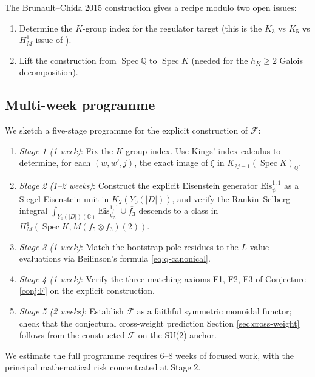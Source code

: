 \documentclass[11pt]{amsart}
\theoremstyle{definition}
\theoremstyle{remark}
\DeclareMathOperator{\Spec}{Spec}
\newcommand{\Q}{\mathbb{Q}}
\newcommand{\C}{\mathbb{C}}
\begin{document}
The Brunault--Chida 2015 construction \cite{BrunaultChida2015} gives a
recipe modulo two open issues:
\begin{enumerate}
\item Determine the $K$-group index for the regulator target (this
is the $K_3$ vs $K_5$ vs $H^1_M$ issue of \cite{OPBeilinsonQD}).
\item Lift the construction from $\Spec \Q$ to $\Spec K$
(needed for the $h_K \ge 2$ Galois decomposition).
\end{enumerate}

\subsection{Multi-week programme}\label{ss:multi-week}

We sketch a five-stage programme for the explicit construction of
$\mathcal{F}$:

\begin{enumerate}
\item \emph{Stage 1 (1 week)}: Fix the $K$-group index. Use Kings'
\cite{KingsSprang2025} index calculus to determine, for each
$(w, w', j)$, the exact image of $\xi$ in $K_{2j-1}(\Spec K)_\Q$.

\item \emph{Stage 2 (1--2 weeks)}: Construct the explicit Eisenstein
generator $\mathrm{Eis}^{1,1}_\psi$ as a Siegel-Eisenstein unit in
$K_2(Y_0(|D|))$, and verify the Rankin--Selberg integral
$\int_{Y_0(|D|)(\C)} \mathrm{Eis}^{1,1}_{\psi_5} \cup \overline{f_3}$
descends to a class in $H^1_M(\Spec K, M(f_5 \otimes f_3)(2))$.

\item \emph{Stage 3 (1 week)}: Match the bootstrap pole residues to
the $L$-value evaluations via Beilinson's formula
\eqref{eq:q-canonical}.

\item \emph{Stage 4 (1 week)}: Verify the three matching axioms F1, F2,
F3 of Conjecture \ref{conj:F} on the explicit construction.

\item \emph{Stage 5 (2 weeks)}: Establish $\mathcal{F}$ as a faithful
symmetric monoidal functor; check that the conjectural cross-weight
prediction Section \ref{sec:cross-weight} follows from the constructed
$\mathcal{F}$ on the SU(2) anchor.
\end{enumerate}

We estimate the full programme requires 6--8 weeks of focused work,
with the principal mathematical risk concentrated at Stage 2.
\end{document}
